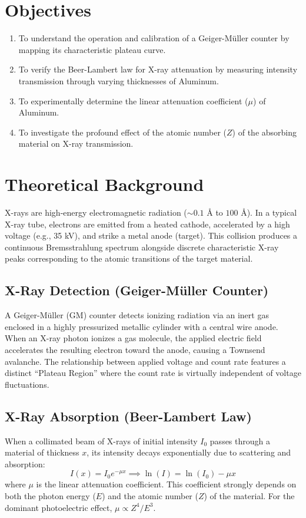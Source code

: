 \documentclass[a4paper,11pt]{article}
\begin{document}
\section{Objectives}
\begin{enumerate}
    \item To understand the operation and calibration of a Geiger-M\"{u}ller counter by mapping its characteristic plateau curve.
    \item To verify the Beer-Lambert law for X-ray attenuation by measuring intensity transmission through varying thicknesses of Aluminum.
    \item To experimentally determine the linear attenuation coefficient ($\mu$) of Aluminum.
    \item To investigate the profound effect of the atomic number ($Z$) of the absorbing material on X-ray transmission.
\end{enumerate}

\section{Theoretical Background}
X-rays are high-energy electromagnetic radiation ($\sim 0.1\text{ \AA}$ to $100\text{ \AA}$). In a typical X-ray tube, electrons are emitted from a heated cathode, accelerated by a high voltage (e.g., 35 kV), and strike a metal anode (target). This collision produces a continuous Bremsstrahlung spectrum alongside discrete characteristic X-ray peaks corresponding to the atomic transitions of the target material.

\subsection{X-Ray Detection (Geiger-M\"{u}ller Counter)}
A Geiger-M\"{u}ller (GM) counter detects ionizing radiation via an inert gas enclosed in a highly pressurized metallic cylinder with a central wire anode. When an X-ray photon ionizes a gas molecule, the applied electric field accelerates the resulting electron toward the anode, causing a Townsend avalanche. The relationship between applied voltage and count rate features a distinct ``Plateau Region'' where the count rate is virtually independent of voltage fluctuations. 

\subsection{X-Ray Absorption (Beer-Lambert Law)}
When a collimated beam of X-rays of initial intensity $I_0$ passes through a material of thickness $x$, its intensity decays exponentially due to scattering and absorption:
\begin{equation}
    I(x) = I_0 e^{-\mu x} \implies \ln(I) = \ln(I_0) - \mu x
\end{equation}
where $\mu$ is the linear attenuation coefficient. This coefficient strongly depends on both the photon energy ($E$) and the atomic number ($Z$) of the material. For the dominant photoelectric effect, $\mu \propto Z^4 / E^3$.
\end{document}
